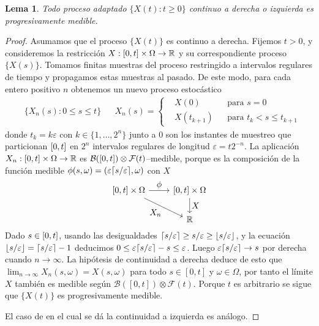 \documentclass{report}
\newcommand{\leftOpenInterval}{\left]}
\newcommand{\rightOpenInterval}{\right[}
\newcommand{\leftClosedInterval}{\left[}
\newcommand{\rightClosedInterval}{\right]}
\newcommand{\interval}[3]{%
    \ifstrequal{#1}{oo}{%
      \leftOpenInterval #2, #3 \rightOpenInterval%
    }{%
      \ifstrequal{#1}{co}{%
        \leftClosedInterval #2, #3 \rightOpenInterval%
      }{%
        \ifstrequal{#1}{oc}{
          \leftOpenInterval #2, #3 \rightClosedInterval%
        }{%
          \ifstrequal{#1}{cc}{
            \leftClosedInterval #2, #3 \rightClosedInterval
          }{%
          }%
        }%
      }%
    }%
  }
\newcommand{\events}{\mathcal{F}}
\newcommand{\borel}{\mathcal{B}}
\newcommand{\realNumbers}{\mathbb{R}}
\DeclarePairedDelimiter{\ceil}{\lceil}{\rceil}
\DeclarePairedDelimiter{\floor}{\lfloor}{\rfloor}
\theoremstyle{plain}
\newtheorem{lemma}{Lema}
\theoremstyle{remark}
\theoremstyle{definition}
\begin{document}
\begin{lemma}
  Todo proceso adaptado \(\{X(t) : t \geq 0\}\) continuo a derecha o izquierda es progresivamente medible.
\end{lemma}
\begin{proof}
  Asumamos que el proceso \(\{X(t)\}\) es continuo a derecha.
  Fijemos \(t > 0\), y consideremos la restricción \(X : \interval{cc}{0}{t} \times \Omega \rightarrow \realNumbers\) y su correspondiente proceso \(\{X(s)\}\).
  Tomamos finitas muestras del proceso restringido a intervalos regulares de tiempo y propagamos estas muestras al pasado.
  De este modo, para cada entero positivo \(n\) obtenemos un nuevo proceso estocástico
  \begin{align}
    &\{X_n(s) : 0 \leq s \leq t\}
    &&
    X_n(s)
    =
    \left\{
      \begin{aligned}
        &X(0) 
          &&\text{para } 
            s = 0
          \\
        &X(t_{k + 1})
          &&\text{para }
            t_k < s \leq t_{k + 1}
      \end{aligned}
    \right.
  \end{align}
  donde \(t_k = k \varepsilon\) con \(k \in \{1, \dots, 2^n\}\) junto a 0 son los instantes de muestreo que particionan \(\interval{cc}{0}{t}\) en \(2^n\) intervalos regulares de longitud \(\varepsilon = t 2^{- n}\).
  La aplicación \(X_n : \interval{cc}{0}{t} \times \Omega \rightarrow \realNumbers\) es \(\borel(\interval{cc}{0}{t}) \otimes \events(t)\)--medible, porque es la composición de la función medible \(\phi(s, \omega) = (\varepsilon \ceil{s / \varepsilon}, \omega)\) con \(X\)
  \begin{align}
    \begin{tikzcd}
      [
        ampersand replacement=\&,
        execute at begin picture={
          \useasboundingbox (-1,-0.5) rectangle (1,1.25);
        }
      ]
      \interval{cc}{0}{t} \times \Omega
      \arrow{r}{\displaystyle \phi}
      \arrow{rd}[swap]{\displaystyle X_n}
        \& \interval{cc}{0}{t} \times \Omega
          \arrow{d}{\displaystyle X} \\
        \&  \realNumbers\\
    \end{tikzcd}
  \end{align}
  Dado \(s \in \interval{cc}{0}{t}\), usando las desigualdades \(\ceil{s / \varepsilon} \geq s / \varepsilon \geq \floor{s / \varepsilon}\), y la ecuación \(\floor{s / \varepsilon} = \ceil{s / \varepsilon} - 1\) deducimos \(0 \leq \varepsilon \ceil{s / \varepsilon} - s \leq \varepsilon\).
  Luego \(\varepsilon \ceil{s / \varepsilon} \rightarrow s\) por derecha cuando \(n \rightarrow \infty\).
  La hipótesis de continuidad a derecha deduce de esto que \(\lim_{n \rightarrow \infty} X_n(s, \omega) = X(s, \omega)\) para todo \(s \in [0, t]\) y \(\omega \in \Omega\), por tanto el límite \(X\) también es medible según \(\borel([0, t]) \otimes \events(t)\).
  Porque \(t\) es arbitrario se sigue que \(\{X(t)\}\) es progresivamente medible.

  El caso de en el cual se dá la continuidad a izquierda es análogo.
\end{proof}
\end{document}
